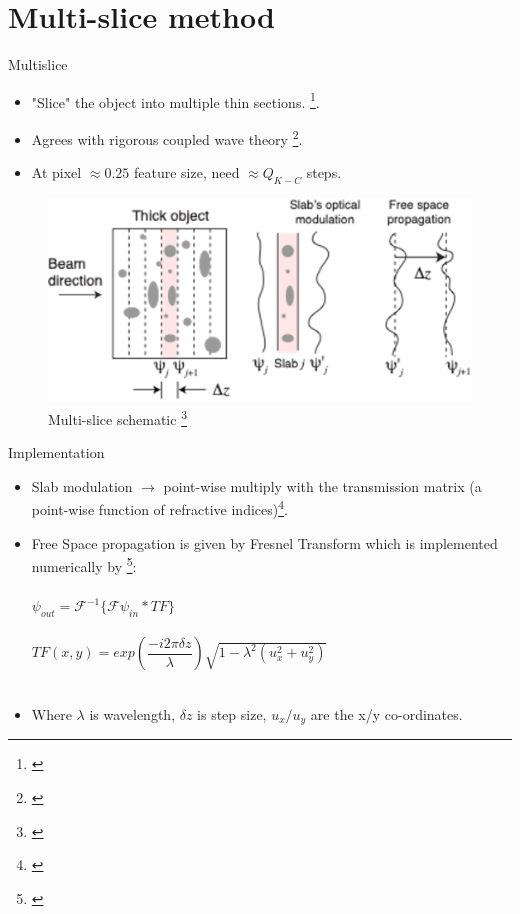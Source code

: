 \documentclass{beamer}
\begin{document}
\section{Multi-slice method}
\begin{frame}{Multislice}
	\begin{itemize}
		\item "Slice" the object into multiple thin sections.
		\footnote{\cite{ms_1957,VanRoey81,Li17}}.
		\item Agrees with rigorous coupled wave theory \footnote{\cite{Li17}}.
		\item At pixel $\approx0.25$ feature size, need $\approx Q_{K-C}$ steps.
	\end{itemize}
	\begin{center}
		\begin{figure}
			\includegraphics[scale=0.2275]{ms}
			\caption{Multi-slice schematic \footnote{\cite{jacobsen_2019}} }
		\end{figure}
	\end{center}
\end{frame}

\begin{frame}{Implementation}
	\begin{itemize}
		\item Slab modulation $\rightarrow$ point-wise multiply with the transmission matrix (a point-wise function of refractive indices)\footnote{\cite{ms_1957,VanRoey81,Li17}}.
		\item Free Space propagation is given by Fresnel Transform which is implemented numerically by \footnote{\cite{goodman_2017}}:
		\\~\\
		\qquad $\psi_{out}=\mathcal{F}^{-1}\{\mathcal{F}\psi_{in}*TF\}$
		\\~\\
		$TF(x,y) = exp(\dfrac{-i2\pi\delta z}{\lambda})\sqrt{1-\lambda^2(u_x^2+u_y^2)}$
		\\~\\
		\item Where $\lambda$ is wavelength, $\delta z$ is step size, $u_x/u_y$ are the x/y co-ordinates.	
	\end{itemize}
\end{frame}
\end{document}
